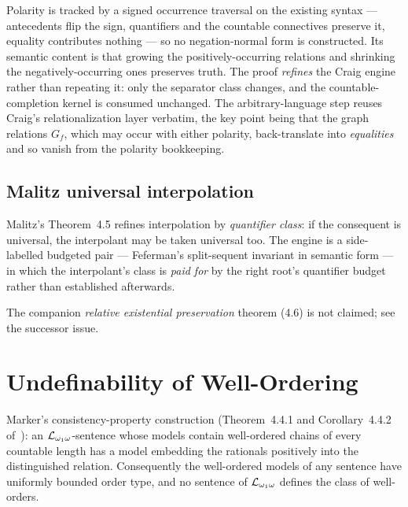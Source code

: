 Polarity is tracked by a signed occurrence traversal on the existing syntax ---
antecedents flip the sign, quantifiers and the countable connectives preserve it,
equality contributes nothing --- so no negation-normal form is constructed.  Its
semantic content is that growing the positively-occurring relations and shrinking
the negatively-occurring ones preserves truth.  The proof \emph{refines} the
Craig engine rather than repeating it: only the separator class changes, and the
countable-completion kernel is consumed unchanged.  The arbitrary-language step
reuses Craig's relationalization layer verbatim, the key point being that the
graph relations $G_f$, which may occur with either polarity, back-translate into
\emph{equalities} and so vanish from the polarity bookkeeping.



\section{Malitz universal interpolation}

Malitz's Theorem~4.5 refines interpolation by \emph{quantifier class}: if the consequent is
universal, the interpolant may be taken universal too.  The engine is a side-labelled budgeted
pair --- Feferman's split-sequent invariant in semantic form --- in which the interpolant's class
is \emph{paid for} by the right root's quantifier budget rather than established afterwards.

The companion \emph{relative existential preservation} theorem (4.6) is not claimed; see the
successor issue.


\chapter{Undefinability of Well-Ordering}

Marker's consistency-property construction (Theorem~4.4.1 and Corollary~4.4.2
of~\cite{marker2016}): an $\mathcal{L}_{\omega_1\omega}$-sentence whose models
contain well-ordered chains of every countable length has a model embedding the rationals
positively into the distinguished relation.  Consequently the well-ordered models of any
sentence have uniformly bounded order type, and no sentence of $\mathcal{L}_{\omega_1\omega}$ defines the
class of well-orders.


